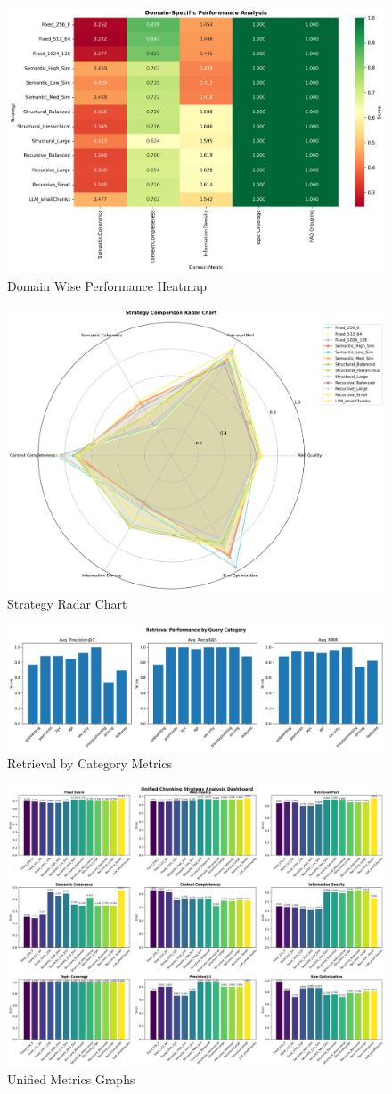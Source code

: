 	\begin{figure}[htbp]
		\centering
		\includegraphics[width=0.6\linewidth,keepaspectratio]{domain_performance_heatmap.png}
		\caption{Domain Wise Performance Heatmap}
		\label{fig1}
	\end{figure}
	
	\begin{figure}[htbp]
		\centering
		\includegraphics[width=0.6\linewidth,keepaspectratio]{strategy_radar_chart.png}
		\caption{Strategy Radar Chart}
		\label{fig2}
	\end{figure}
	
	\begin{figure}[htbp]
		\centering
		\includegraphics[width=0.6\linewidth,keepaspectratio]{retrieval_by_category.png}
		\caption{Retrieval by Category Metrics}
		\label{fig3}
	\end{figure}
	
	\begin{figure}[htbp]
		\centering
		\includegraphics[width=0.6\linewidth,keepaspectratio]{unified_performance_dashboard.png}
		\caption{Unified Metrics Graphs}
		\label{fig4}
	\end{figure}
	
